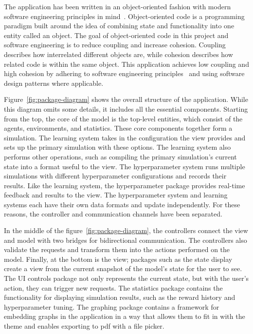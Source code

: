 \documentclass[]{final_report}
\begin{document}
The application has been written in an object-oriented fashion with modern software engineering principles in mind~\cite{van2008software}. Object-oriented code is a programming paradigm built around the idea of combining state and functionality into one entity called an object. The goal of object-oriented code in this project and software engineering is to reduce coupling and increase cohesion. Coupling describes how interrelated different objects are, while cohesion describes how related code is within the same object. This application achieves low coupling and high cohesion by adhering to software engineering principles~\cite{softwareEngineringPrinciples} and using software design patterns where applicable.

Figure~\ref{fig:package-diagram} shows the overall structure of the application. While this diagram omits some details, it includes all the essential components. Starting from the top, the core of the model is the top-level entities, which consist of the agents, environments, and statistics. These core components together form a simulation. The learning system takes in the configuration the view provides and sets up the primary simulation with these options. The learning system also performs other operations, such as compiling the primary simulation's current state into a format useful to the view. The hyperparameter system runs multiple simulations with different hyperparameter configurations and records their results. Like the learning system, the hyperparameter package provides real-time feedback and results to the view. The hyperparameter system and learning systems each have their own data formats and update independently. For these reasons, the controller and communication channels have been separated. 

In the middle of the figure~\ref{fig:package-diagram}, the controllers connect the view and model with two bridges for bidirectional communication. The controllers also validate the requests and transform them into the actions performed on the model. Finally, at the bottom is the view; packages such as the state display create a view from the current snapshot of the model's state for the user to see. The UI controls package not only represents the current state, but with the user's action, they can trigger new requests. The statistics package contains the functionality for displaying simulation results, such as the reward history and hyperparameter tuning. The graphing package contains a framework for embedding graphs in the application in a way that allows them to fit in with the theme and enables exporting to pdf with a file picker.
\end{document}
